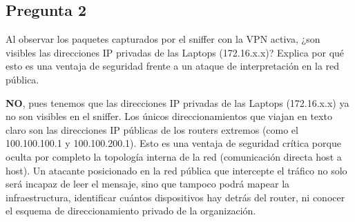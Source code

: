 \subsection{Pregunta 2}

Al observar los paquetes capturados por el sniffer con la VPN activa, ¿son visibles las direcciones IP privadas de las Laptops (172.16.x.x)? Explica por qué esto es una ventaja de seguridad frente a un ataque de interpretación en la red pública.

\begin{respuesta}
    \textbf{NO}, pues tenemos que las direcciones IP privadas de las Laptops (172.16.x.x) ya no son visibles en el sniffer. Los únicos direccionamientos que viajan en texto claro son las direcciones IP públicas de los routers extremos (como el 100.100.100.1 y 100.100.200.1). Esto es una ventaja de seguridad crítica porque oculta por completo la topología interna de la red (comunicación directa host a host). Un atacante posicionado en la red pública que intercepte el tráfico no solo será incapaz de leer el mensaje, sino que tampoco podrá mapear la infraestructura, identificar cuántos dispositivos hay detrás del router, ni conocer el esquema de direccionamiento privado de la organización.
\end{respuesta}
